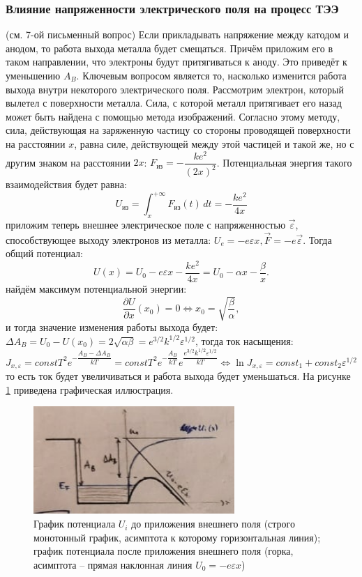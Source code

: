 \subsubsection{Влияние напряженности электрического поля на процесс ТЭЭ}

(см. 7-ой письменный вопрос) Если прикладывать напряжение между катодом и анодом, то работа
выхода металла будет смещаться. Причём приложим его в таком направлении, что
электроны будут притягиваться к аноду. Это приведёт к уменьшению $A_B$. Ключевым вопросом
является то, насколько изменится работа выхода внутри некоторого электрического поля.
Рассмотрим электрон, который вылетел с поверхности металла. Сила, с которой металл
притягивает его назад может быть найдена с помощью метода изображений. Согласно этому
методу, сила, действующая на заряженную частицу со стороны проводящей поверхности на расстоянии $x$,
равна силе, действующей между этой частицей и такой же, но с другим знаком на расстоянии $2x$:
$F_\text{из} = - \dfrac{k e^2}{(2x)^2}$. Потенциальная энергия такого
взаимодействия будет равна:
\[
  U_\text{из} = \int_x^{+\infty} F_\text{из} (t) \, dt
  =  - \dfrac{k e^2}{4 x}
\]
приложим теперь внешнее электрическое поле с напряженностью $\vec{\varepsilon}$, способствующее
выходу электронов из металла: $U_e = - e \varepsilon x, \vec{F} = - e \vec{\varepsilon}$.
Тогда общий потенциал:
\[
  U(x) = U_0 - e \varepsilon x - \dfrac{k e^2}{4 x} = U_0 - \alpha x - \dfrac{\beta}{x}.
\]
найдём максимум потенциальной энергии:
\[
  \dfrac{\partial U}{\partial x} (x_0) = 0 \Leftrightarrow x_0 = \sqrt{\dfrac{\beta}{\alpha}},
\]
и тогда значение изменения работы выхода будет:
$\Delta A_B = U_0 - U(x_0) = 2 \sqrt{\alpha \beta} = e^{3/2} k^{1/2} \varepsilon^{1/2}$,
тогда ток насыщения:
\[
  J_{x, \varepsilon}
  = const T^2 e^{-\dfrac{A_B - \Delta A_B}{kT}}
  = const T^2 e^{-\dfrac{A_B}{kT}} e^{ \dfrac{e^{3/2} k^{1/2} \varepsilon^{1/2}}{kT} }
  \Leftrightarrow
  \ln J_{x, \varepsilon}
  = const_1 + const_2 \varepsilon^{1/2}
\]
то есть ток будет увеличиваться и работа выхода будет уменьшаться.
На рисунке \ref{fig:shottki} приведена графическая иллюстрация.

\begin{figure}[H]
  \centering
  \includegraphics[width=.9\linewidth]{img/oral-04/Shottki.png}
  \caption{График потенциала $U_i$ до приложения внешнего поля (строго монотонный график,
  асимптота к которому горизонтальная линия);
  график потенциала после приложения внешнего поля (горка, асимптота -- прямая наклонная линия $U_0 = - e \varepsilon x$)}
  \label{fig:shottki}
\end{figure}


